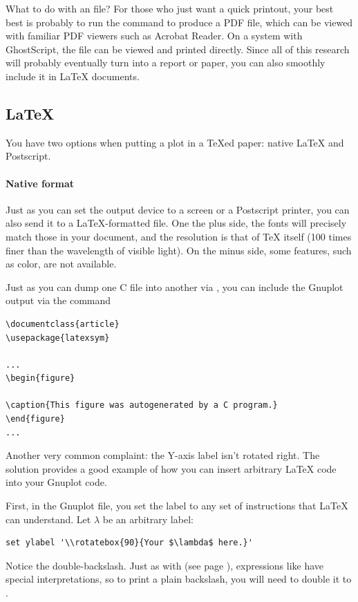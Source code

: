 What to do with an  file? For those who just want a quick
printout, your best best is probably to run the command 
to produce a PDF file, which can be viewed with familiar PDF viewers
such as Acrobat Reader. On a system with GhostScript, the  file
can be viewed and printed directly. Since all of this research will
probably eventually turn into a report or paper, you can also smoothly
include it in \LaTeX{} documents.

\subsection{\treesymbol \LaTeX} 
You have two options when putting a plot in a \TeX{}ed paper: native
\LaTeX{} and Postscript. 

\paragraph{Native format}
Just as you can set the output device to a screen or a Postscript printer,
you can also send it to a \LaTeX-formatted file. One the plus side, the
fonts will precisely match those in your document, and the resolution is
that of \TeX{} itself (100 times finer than the wavelength of
visible light). On the minus side, some features, such as color, are not
available.

Just as you can dump one C file into another via , you can
include the Gnuplot output via the  command
\begin{lstlisting}
\documentclass{article}
\usepackage{latexsym}

...
\begin{figure}

\caption{This figure was autogenerated by a C program.}
\end{figure}
...

\end{lstlisting}

Another very common complaint: the Y-axis label isn't rotated right.
The solution provides a good example of how 
you can insert arbitrary \LaTeX{} code into your Gnuplot code.

First, in the Gnuplot file, you set the label to any set of instructions
that \LaTeX{} can understand. Let $\lambda$ be an arbitrary label:
\begin{lstlisting}
set ylabel '\\rotatebox{90}{Your $\lambda$ here.}'
\end{lstlisting}
Notice the double-backslash. Just as with  (see page
\pageref{printf}), expressions like  have special
interpretations, so to print a plain backslash, you will need to double
it to \ci{$\backslash\backslash$}. 

